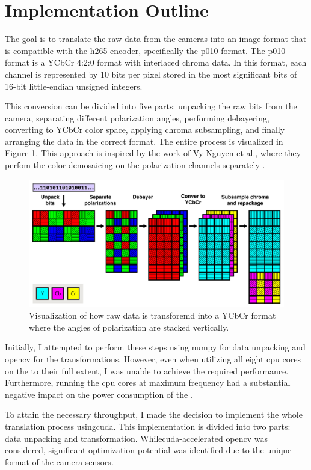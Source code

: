\section{Implementation Outline}
The goal is to translate the raw data from the cameras into an image format that is compatible with the \gls{h265} encoder, specifically the \gls{p010} format.
The \gls{p010} format is a YCbCr 4:2:0 format with interlaced chroma data.
In this format, each channel is represented by 10 bits per pixel stored in the most significant bits of 16-bit little-endian unsigned integers.

This conversion can be divided into five parts: unpacking the raw bits from the camera, separating different polarization angles, performing debayering, converting to YCbCr color space, applying chroma subsampling, and finally arranging the data in the correct format.
The entire process is visualized in Figure \ref{fig:transform}.
This approach is inspired by the work of Vy Nguyen et al., where they perfom the color demosaicing on the polarization channels separately \cite{nguyenTwoStepColorPolarizationDemosaicking2022}.


\begin{figure}[H]
    \centering
    \includegraphics[width=\textwidth]{figures/polarized_image/transform.pdf}
    \caption{Visualization of how raw data is transforemd into a YCbCr format where the angles of polarization are stacked vertically.}
    \label{fig:transform}
\end{figure}


Initially, I attempted to perform these steps using \gls{numpy} for data unpacking and \gls{opencv} for the transformations.
However, even when utilizing all eight \gls{cpu} cores on the \jx to their full extent, I was unable to achieve the required performance.
Furthermore, running the \gls{cpu} cores at maximum frequency had a substantial negative impact on the power consumption of the \jx.

To attain the necessary throughput, I made the decision to implement the whole translation process using\gls{cuda}.
This implementation is divided into two parts: data unpacking and transformation.
While\gls{cuda}-accelerated \gls{opencv} was considered, significant optimization potential was identified due to the unique format of the camera sensors.
